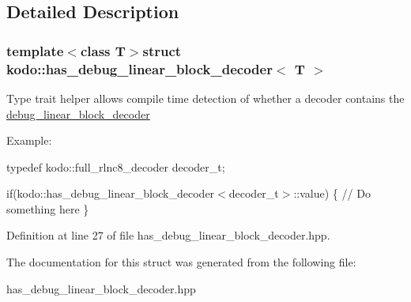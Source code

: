 \subsection{Detailed Description}
\subsubsection*{template$<$class T$>$struct kodo\-::has\-\_\-debug\-\_\-linear\-\_\-block\-\_\-decoder$<$ T $>$}

Type trait helper allows compile time detection of whether a decoder contains the \hyperlink{classkodo_1_1debug__linear__block__decoder}{debug\-\_\-linear\-\_\-block\-\_\-decoder}

Example\-:

typedef kodo\-::full\-\_\-rlnc8\-\_\-decoder decoder\-\_\-t;

if(kodo\-::has\-\_\-debug\-\_\-linear\-\_\-block\-\_\-decoder$<$decoder\-\_\-t$>$\-::value) \{ // Do something here \} 

Definition at line 27 of file has\-\_\-debug\-\_\-linear\-\_\-block\-\_\-decoder.\-hpp.



The documentation for this struct was generated from the following file\-:\begin{DoxyCompactItemize}
\item 
has\-\_\-debug\-\_\-linear\-\_\-block\-\_\-decoder.\-hpp\end{DoxyCompactItemize}
